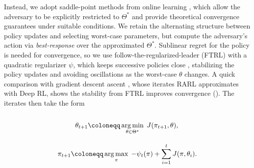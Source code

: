 \documentclass{article} %
\DeclareMathOperator*{\argmax}{arg\,max}
\DeclareMathOperator*{\argmin}{arg\,min}
\let\Cref\crtCref
\newcommand{\CISet}{\Theta^*}
\begin{document}
Instead, we adopt saddle-point methods from online learning \citep{orabona2019modern}, which allow the adversary to be explicitly restricted to $\CISet$ and provide theoretical convergence guarantees under suitable conditions.
We retain the alternating structure between policy updates and selecting worst-case parameters, but compute the adversary's action via \textit{best-response} over the approximated $\CISet$.
Sublinear regret for the policy is needed for convergence, so we use
follow-the-regularized-leader (FTRL) with a quadratic regularizer $\psi$, which keeps successive policies close \citep{orabona2019modern}, stabilizing the policy updates and avoiding oscillations as the worst-case $\theta$ changes. A quick comparison with gradient descent ascent \citep[GDA,][]{benaim1999mixed}, whose iterates RARL approximates with Deep RL, shows the stability from FTRL improves convergence (\Cref{fig:gda_vs_fge}). The iterates then take the form


\begin{minipage}[t]{0.4\linewidth}
    \vspace{-2.1em}
    \begin{equation}
        \theta_{t+1} \coloneqq \argmin_{\theta \in \CISet}\; J(\pi_{t+1}, \theta), 
        \vphantom{
    \pi_{t+1} = \argmin_\pi \psi_t(\pi) + \sum_{i=1}^t J(\pi, \theta_i).
        }
        \label{eq:saddlepoint:best_response}
    \end{equation}
\end{minipage}
\hfill
\begin{minipage}[t]{0.55\linewidth}
    \vspace{-2.1em}
    \begin{equation}
    \pi_{t+1} \coloneqq \argmax_\pi\; -\psi_t(\pi) + \sum_{i=1}^t J(\pi, \theta_i).
    \vphantom{
\theta_{t+1} = \argmax_{\theta \in \CISet} J(\pi_t, \theta), 
    }
    \label{eq:saddlepoint:ftrl}
    \end{equation}
\end{minipage}
\end{document}
